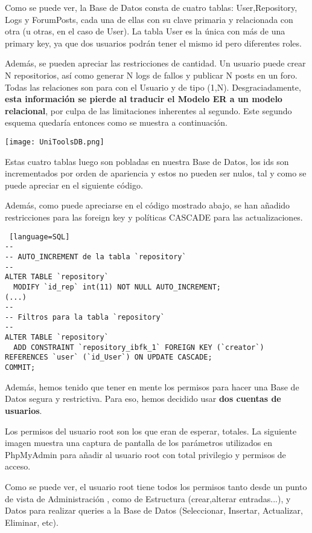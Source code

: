 \documentclass[12pt]{report}
\begin{document}
Como se puede ver, la Base de Datos consta de cuatro tablas: User,Repository, Logs y ForumPosts, cada una de ellas con su clave primaria y relacionada con otra (u otras, en el caso de User). La tabla User es la única con más de una primary key, ya que dos usuarios podrán tener el mismo id pero diferentes roles. 

Además, se pueden apreciar las restricciones de cantidad. Un usuario puede crear N repositorios, así como generar N logs de fallos y publicar N posts en un foro. Todas las relaciones son para con el Usuario y de tipo (1,N). Desgraciadamente, \textbf{esta información se pierde al traducir el Modelo ER a un modelo relacional}, por culpa de las limitaciones inherentes al segundo. Este segundo esquema quedaría entonces como se muestra a continuación.
\newline

\texttt{[image: UniToolsDB.png]}

Estas cuatro tablas luego son pobladas en nuestra Base de Datos, los ids son incrementados por orden de apariencia y estos no pueden ser nulos, tal y como se puede apreciar en el siguiente código.

Además, como puede apreciarse en el código mostrado abajo, se han añadido restricciones para las foreign key y políticas CASCADE para las actualizaciones.
\newline

\begin{lstlisting} [language=SQL]
--
-- AUTO_INCREMENT de la tabla `repository`
--
ALTER TABLE `repository`
  MODIFY `id_rep` int(11) NOT NULL AUTO_INCREMENT;
(...)
--
-- Filtros para la tabla `repository`
--
ALTER TABLE `repository`
  ADD CONSTRAINT `repository_ibfk_1` FOREIGN KEY (`creator`) REFERENCES `user` (`id_User`) ON UPDATE CASCADE;
COMMIT;
\end{lstlisting}

Además, hemos tenido que tener en mente los permisos para hacer una Base de Datos segura y restrictiva. Para eso, hemos decidido usar \textbf{dos cuentas de usuarios}.

Los permisos del usuario root son los que eran de esperar, totales. La siguiente imagen muestra una captura de pantalla de los parámetros utilizados en PhpMyAdmin para añadir al usuario root con total privilegio y permisos de acceso.

Como se puede ver, el usuario root tiene todos los permisos tanto desde un punto de vista de Administración , como de Estructura (crear,alterar entradas...), y Datos para realizar queries a la Base de Datos (Seleccionar, Insertar, Actualizar, Eliminar, etc).
\end{document}
